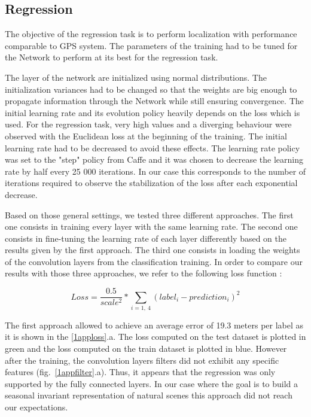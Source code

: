 \subsection{Regression}
The objective of the regression task is to perform localization with performance comparable to GPS system. The parameters of the training had to be tuned for the Network to perform at its best for the regression task.

The layer of the network are initialized using normal distributions. The initialization variances had to be changed so that the weights are big enough to propagate information through the Network while still ensuring convergence.
The initial learning rate and its evolution policy heavily depends on the loss which is used. For the regression task, very high values and a diverging behaviour were observed with the Euclidean loss at the beginning of the training. The initial learning rate had to be decreased to avoid these effects. The learning rate policy was set to the "step" policy from Caffe and it was chosen to decrease the learning rate by half every 25 000 iterations. In our case this corresponds to the number of iterations required to observe the stabilization of the loss after each exponential decrease.

Based on those general settings, we tested three different approaches. The first one consists in training every layer with the same learning rate. The second one consists in fine-tuning the learning rate of each layer differently based on the results given by the first approach. The third one consists in loading the weights of the convolution layers from the classification training. In order to compare our results with those three approaches, we refer to the following loss function :

\begin{equation} 
Loss = \frac{0.5}{scale^{2}}*\sum_{i=1,\ 4}(label_{i}-prediction_{i})^{2}
\end{equation}

The first approach allowed to achieve an average error of 19.3 meters per label as it is shown in the \ref{1apploss}.a. The loss computed on the test dataset is plotted in green and the loss computed on the train dataset is plotted in blue. However after the training, the convolution layers filters did not exhibit any specific features (fig.~\ref{1appfilter}.a). Thus, it appears that the regression was only supported by the fully connected layers. In our case where the goal is to build a seasonal invariant representation of natural scenes this approach did not reach our expectations. 

